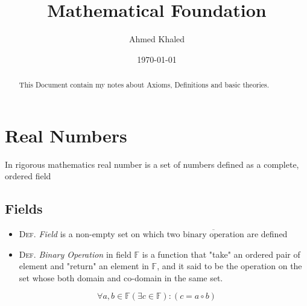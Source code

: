 \documentclass[11pt, a4paper]{article}
\author{Ahmed Khaled}
\date{\today}
\title{Mathematical Foundation}
\begin{document}
\maketitle
\begin{abstract}
This Document contain my notes about Axioms, Definitions and basic theories.
\end{abstract}

\section{Real Numbers}
\label{sec:org2f5e07d}
In rigorous mathematics real number is a set of numbers defined as a complete, ordered field

\subsection{Fields}
\label{sec:org061704e}

\begin{itemize}
\item \textsc{Def}. \emph{Field} is a non-empty set on which two \(\overline{\mbox{binary operation}}\) are
defined 

\item \textsc{Def}. \emph{Binary Operation} in field \(\mathbb{F}\) is a function that "take"
an ordered pair of element and "return" an element in \(\mathbb{F}\), and it said to be
the operation on the set whose both domain and co-domain in the same set.
\end{itemize}
\[ \forall a,b \in \mathbb{F} (\exists c \in \mathbb{F}) : (c = a \circ b) \]
\end{document}
